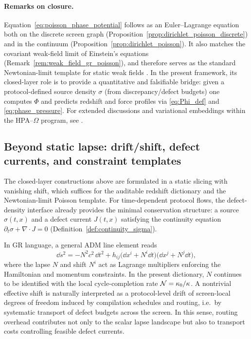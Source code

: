 \paragraph{Remarks on closure.}
Equation~\eqref{eq:poisson_phase_potential} follows as an Euler--Lagrange equation both on the discrete screen graph (Proposition~\ref{prop:dirichlet_poisson_discrete}) and in the continuum (Proposition~\ref{prop:dirichlet_poisson}).
It also matches the covariant weak-field limit of Einstein's equations (Remark~\ref{rem:weak_field_gr_poisson}), and therefore serves as the standard Newtonian-limit template for static weak fields \cite{Evans2010PDE,MisnerThorneWheeler1973,Wald1984,Carroll2004,Poisson2004}.
In the present framework, its closed-layer role is to provide a quantitative and falsifiable bridge:
given a protocol-defined source density $\sigma$ (from discrepancy/defect budgets) one computes $\Phi$ and predicts redshift and force profiles via \eqref{eq:Phi_def} and \eqref{eq:phase_pressure}.
For extended discussions and variational embeddings within the HPA--$\Omega$ program, see \cite{Ma2025HPD,Ma2025CAP}.

\subsection{Beyond static lapse: drift/shift, defect currents, and constraint templates}
\label{sec:beyond_static_shift}

The closed-layer constructions above are formulated in a static slicing with vanishing shift, which suffices for the auditable redshift dictionary and the Newtonian-limit Poisson template.
For time-dependent protocol flows, the defect-density interface already provides the minimal conservation structure: a source $\sigma(t,x)$ and a defect current $J(t,x)$ satisfying the continuity equation $\partial_t\sigma+\nabla\cdot J=0$ (Definition~\ref{def:continuity_sigma}).

In GR language, a general ADM line element reads
\[
\dd s^2=-N^2 c^2\,\dd t^2+h_{ij}\bigl(\dd x^i+N^i\dd t\bigr)\bigl(\dd x^j+N^j\dd t\bigr),
\]
where the lapse $N$ and shift $N^i$ act as Lagrange multipliers enforcing the Hamiltonian and momentum constraints.
In the present dictionary, $N$ continues to be identified with the local cycle-completion rate $\mathcal{N}=\kappa_0/\kappa$.
A nontrivial effective shift is naturally interpreted as a protocol-level drift of screen-local degrees of freedom induced by compilation schedules and routing, i.e.\ by systematic transport of defect budgets across the screen.
In this sense, routing overhead contributes not only to the scalar lapse landscape but also to transport costs controlling feasible defect currents.

